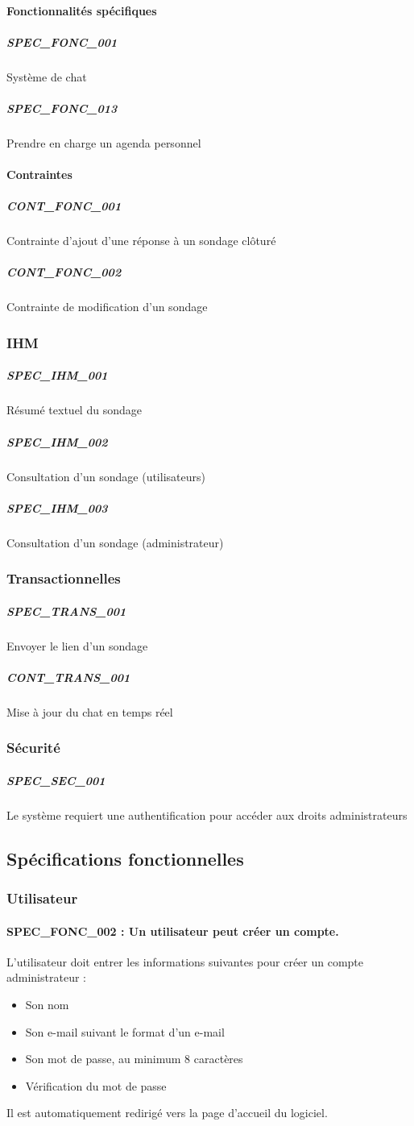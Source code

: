 \documentclass[]{report}
\begin{document}
\paragraph{Fonctionnalités spécifiques}
\subparagraph{SPEC\_FONC\_001} Système de chat
\subparagraph{SPEC\_FONC\_013} Prendre en charge un agenda personnel

\paragraph{Contraintes}
\subparagraph{CONT\_FONC\_001} Contrainte d’ajout d’une réponse à un sondage clôturé
\subparagraph{CONT\_FONC\_002} Contrainte de modification d’un sondage

\subsubsection{IHM}
\subparagraph{SPEC\_IHM\_001} Résumé textuel du sondage
\subparagraph{SPEC\_IHM\_002} Consultation d’un sondage (utilisateurs)
\subparagraph{SPEC\_IHM\_003} Consultation d’un sondage (administrateur)

\subsubsection{Transactionnelles}
\subparagraph{SPEC\_TRANS\_001} Envoyer le lien d’un sondage
\subparagraph{CONT\_TRANS\_001} Mise à jour du chat en temps réel

\subsubsection{Sécurité}
\subparagraph{SPEC\_SEC\_001} Le système requiert une authentification pour accéder aux droits administrateurs

\subsection{Spécifications fonctionnelles}

\subsubsection{Utilisateur}
\paragraph{SPEC\_FONC\_002 : Un utilisateur peut créer un compte.}
L’utilisateur doit entrer les informations suivantes pour créer un compte administrateur :
\begin{itemize}
\item Son nom
\item Son e-mail suivant le format d’un e-mail
\item Son mot de passe, au minimum 8 caractères
\item Vérification du mot de passe \end{itemize}
Il est automatiquement redirigé vers la page d’accueil du logiciel.
\end{document}
